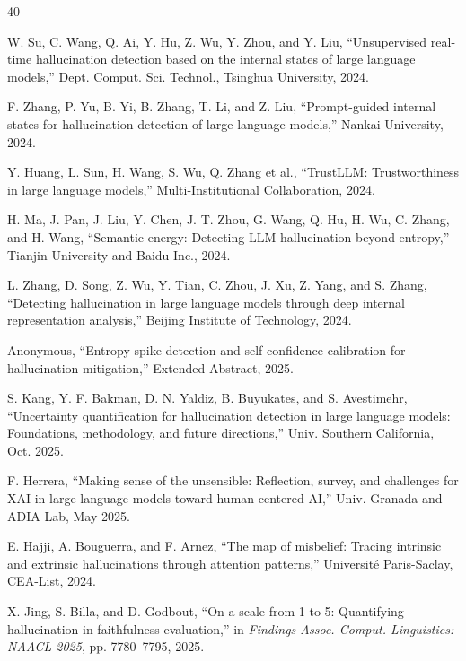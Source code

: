 \documentclass{article}
\begin{document}
\begin{thebibliography}{40}

W. Su, C. Wang, Q. Ai, Y. Hu, Z. Wu, Y. Zhou, and Y. Liu,
``Unsupervised real-time hallucination detection based on the internal states of large language models,''
Dept. Comput. Sci. Technol., Tsinghua University, 2024.

F. Zhang, P. Yu, B. Yi, B. Zhang, T. Li, and Z. Liu,
``Prompt-guided internal states for hallucination detection of large language models,''
Nankai University, 2024.

Y. Huang, L. Sun, H. Wang, S. Wu, Q. Zhang et al.,
``TrustLLM: Trustworthiness in large language models,''
Multi-Institutional Collaboration, 2024.

H. Ma, J. Pan, J. Liu, Y. Chen, J. T. Zhou, G. Wang, Q. Hu, H. Wu, C. Zhang, and H. Wang,
``Semantic energy: Detecting LLM hallucination beyond entropy,''
Tianjin University and Baidu Inc., 2024.

L. Zhang, D. Song, Z. Wu, Y. Tian, C. Zhou, J. Xu, Z. Yang, and S. Zhang,
``Detecting hallucination in large language models through deep internal representation analysis,''
Beijing Institute of Technology, 2024.

Anonymous,
``Entropy spike detection and self-confidence calibration for hallucination mitigation,''
Extended Abstract, 2025.

S. Kang, Y. F. Bakman, D. N. Yaldiz, B. Buyukates, and S. Avestimehr,
``Uncertainty quantification for hallucination detection in large language models: Foundations, methodology, and future directions,''
Univ. Southern California, Oct. 2025.

F. Herrera,
``Making sense of the unsensible: Reflection, survey, and challenges for XAI in large language models toward human-centered AI,''
Univ. Granada and ADIA Lab, May 2025.

E. Hajji, A. Bouguerra, and F. Arnez,
``The map of misbelief: Tracing intrinsic and extrinsic hallucinations through attention patterns,''
Universit\'{e} Paris-Saclay, CEA-List, 2024.

X. Jing, S. Billa, and D. Godbout,
``On a scale from 1 to 5: Quantifying hallucination in faithfulness evaluation,''
in \textit{Findings Assoc. Comput. Linguistics: NAACL 2025}, pp. 7780--7795, 2025.


\end{thebibliography}
\end{document}
